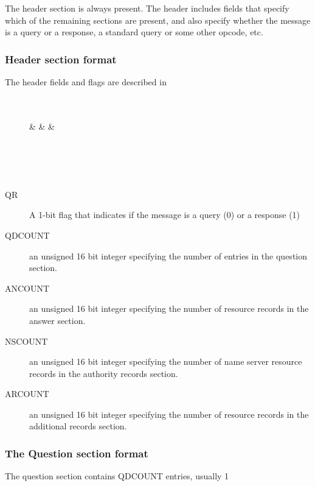 \documentclass{article}
\begin{document}
The header section is always present.  The header includes fields that
specify which of the remaining sections are present, and also specify
whether the message is a query or a response, a standard query or some
other opcode, etc.

\subsubsection{Header section format}
The header fields and flags are described in \citep[RFC~1035 4.1.1]{rfc1035}
\begin{figure}[ht]
\begin{bytefield}[bitwidth=2em]{16}
	\\
	\\
	 &  & 
	 &
	 \\
	\\
	\\
	\\
	\\
\end{bytefield}
\end{figure}
\begin{description}
	\item[QR] A 1-bit flag that indicates if the message is a query (0) or a
		response (1)
	\item[QDCOUNT] an unsigned 16 bit integer specifying the number of entries
		in the question section.

	\item[ANCOUNT] an unsigned 16 bit integer specifying the number of
		resource records in the answer section.

	\item[NSCOUNT] an unsigned 16 bit integer specifying the number of name
		server resource records in the authority records section.

	\item[ARCOUNT] an unsigned 16 bit integer specifying the number of
		resource records in the additional records section.
\end{description}


\subsubsection{The Question section format}
The question section contains QDCOUNT entries, usually 1
\end{document}
